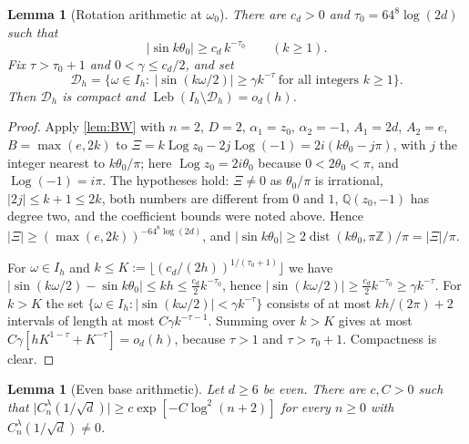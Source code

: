 \documentclass[11pt]{amsart}
\numberwithin{equation}{section}
\newtheorem{lemma}[theorem]{Lemma}
\theoremstyle{definition}
\theoremstyle{remark}
\newcommand{\Z}{\mathbb{Z}}
\newcommand{\Q}{\mathbb{Q}}
\newcommand{\abs}[1]{\lvert #1\rvert}
\newcommand{\dist}{\operatorname{dist}}
\newcommand{\Leb}{\operatorname{Leb}}
\newcommand{\Log}{\operatorname{Log}}
\newcommand{\Dh}{\mathcal D_h}
\begin{document}
\begin{lemma}[Rotation arithmetic at $\omega_0$]\label{lem:circle}
There are $c_d>0$ and $\tau_0=64^8\log(2d)$ such that
\begin{equation}\label{eq:sinbw}
\abs{\sin k\theta_0}\ge c_d\,k^{-\tau_0}\qquad(k\ge1).
\end{equation}
Fix $\tau>\tau_0+1$ and $0<\gamma\le c_d/2$, and set
\[
\Dh=\{\omega\in I_h:\ \abs{\sin(k\omega/2)}\ge\gamma k^{-\tau}\ \text{for all integers }k\ge1\}.
\]
Then $\Dh$ is compact and $\Leb(I_h\setminus\Dh)=o_d(h)$.
\end{lemma}

\begin{proof}
Apply \cref{lem:BW} with $n=2$, $D=2$, $\alpha_1=z_0$, $\alpha_2=-1$, $A_1=2d$, $A_2=e$, $B=\max(e,2k)$ to $\Xi=k\Log z_0-2j\Log(-1)=2i(k\theta_0-j\pi)$, with $j$ the integer nearest to $k\theta_0/\pi$; here $\Log z_0=2i\theta_0$ because $0<2\theta_0<\pi$, and $\Log(-1)=i\pi$. The hypotheses hold: $\Xi\ne0$ as $\theta_0/\pi$ is irrational, $\abs{2j}\le k+1\le2k$, both numbers are different from $0$ and $1$, $\Q(z_0,-1)$ has degree two, and the coefficient bounds were noted above. Hence $\abs\Xi\ge(\max(e,2k))^{-64^8\log(2d)}$, and $\abs{\sin k\theta_0}\ge2\dist(k\theta_0,\pi\Z)/\pi=\abs\Xi/\pi$.

For $\omega\in I_h$ and $k\le K:=\lfloor(c_d/(2h))^{1/(\tau_0+1)}\rfloor$ we have $\abs{\sin(k\omega/2)-\sin k\theta_0}\le kh\le\frac{c_d}2k^{-\tau_0}$, hence $\abs{\sin(k\omega/2)}\ge\frac{c_d}2k^{-\tau_0}\ge\gamma k^{-\tau}$. For $k>K$ the set $\{\omega\in I_h:\abs{\sin(k\omega/2)}<\gamma k^{-\tau}\}$ consists of at most $kh/(2\pi)+2$ intervals of length at most $C\gamma k^{-\tau-1}$. Summing over $k>K$ gives at most $C\gamma[hK^{1-\tau}+K^{-\tau}]=o_d(h)$, because $\tau>1$ and $\tau>\tau_0+1$. Compactness is clear.
\end{proof}

\begin{lemma}[Even base arithmetic]\label{lem:evenlow}
Let $d\ge6$ be even. There are $c,C>0$ such that $\abs{C^\lambda_n(1/\sqrt d)}\ge c\exp[-C\log^2(n+2)]$ for every $n\ge0$ with $C^\lambda_n(1/\sqrt d)\ne0$.
\end{lemma}
\end{document}
